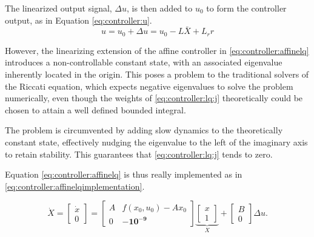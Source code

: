     The linearized output signal, $\Delta u$, is then added
    to $u_{0}$ to form the controller output, as in Equation \eqref{eq:controller:u}.
    \begin{equation}
    \label{eq:controller:u}
        u = u_{0} + \Delta u = u_{0} - L\bar{X} + L_{r}r
    \end{equation}

    However, the linearizing extension of the affine controller in \eqref{eq:controller:affinelq}
    introduces a non-controllable constant state, with
    an associated eigenvalue inherently located in the
    origin.
    This poses a problem to the traditional solvers of the Riccati equation, which
    expects negative eigenvalues to solve the problem numerically, even though
    the weights of \eqref{eq:controller:lq:j} theoretically could be chosen to
    attain a well defined bounded integral.

    The problem is circumvented by adding slow dynamics to the theoretically
    constant state, effectively nudging the eigenvalue to the left of the
    imaginary axis to retain stability.
    This guarantees that \eqref{eq:controller:lq:j} tends to zero.

    Equation \eqref{eq:controller:affinelq} is thus really implemented as in \eqref{eq:controller:affinelqimplementation}.

    \begin{equation}
    \label{eq:controller:affinelqimplementation}
        \dot{X} = \left[
        \begin{array}{c}
            \dot{x} \\
            0
        \end{array}\right] =
        \left[
        \begin{array}{cc}
            A & f(x_{0},u_{0})-Ax_{0} \\
            0 & \mathbf{-10^{-9}}
        \end{array}\right]
        \underbrace{\left[
        \begin{array}{c}
            x \\
            1
        \end{array}\right]}_{X}
        +
        \left[
        \begin{array}{c}
            B \\
            0
        \end{array}\right]
        \Delta u.
    \end{equation}
